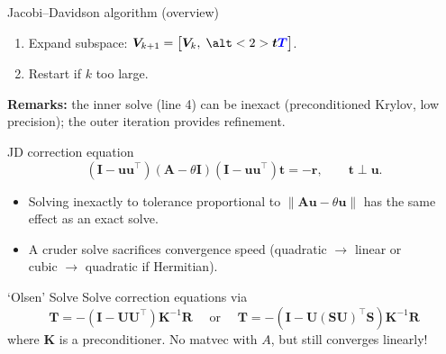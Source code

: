 \documentclass[xcolor=dvipsnames,10pt]{beamer}
\renewcommand{\vec}[1]{\bm{#1}}
\newcommand{\mat}[1]{\bm{#1}}
\newcommand{\bl}[1]{{\color{blue}#1}}
\begin{document}
\begin{frame}{Jacobi--Davidson algorithm (overview)}
\begin{enumerate}
    \item Expand subspace:
          $\mat{V}_{k+1}=\bigl[\mat{V}_k,\;
           \alt<2>{\vec{t}}{\bl{\mat{T}}}\bigr]$.
 
    \item Restart if $k$ too large.
 
  \end{enumerate}
\pause
\textbf{Remarks:} the inner solve (line 4) can be inexact (preconditioned
Krylov, low precision); the outer iteration provides refinement.
\end{frame}

\begin{frame}{JD correction equation}
\vspace{-0.3cm}
\begin{equation*}
  (\mat{I}-\vec{u}\vec{u}^\top)(\mat{A}-\theta\mat{I})
  (\mat{I}-\vec{u}\vec{u}^\top)\vec{t}=-\vec{r},
  \qquad\vec{t}\perp\vec{u}.
\end{equation*}
\vspace{-0.5cm}
\begin{itemize}
  \item Solving inexactly to tolerance proportional to
        $\|\mat{A}\vec{u}-\theta\vec{u}\|$ has the same effect as an exact solve.
  \item A cruder solve sacrifices convergence speed
        (quadratic $\rightarrow$ linear or \\ cubic $\rightarrow$ quadratic if Hermitian).
\end{itemize}
\pause
\begin{block}{`Olsen' Solve}
    Solve correction equations via
    \begin{equation*}
        \vec{T} = -(\mat{I}-\mat{UU}^\top)\mat{K}^{-1}\vec{R} \quad \text{ or } \quad \vec{T} = -(\mat{I}-\mat{U}(\mat{SU})^\top\vec{S})\mat{K}^{-1}\vec{R}
    \end{equation*} where $\mat{K}$ is a preconditioner. No matvec with $A$, but still converges linearly!
\end{block}
\end{frame}
\end{document}
